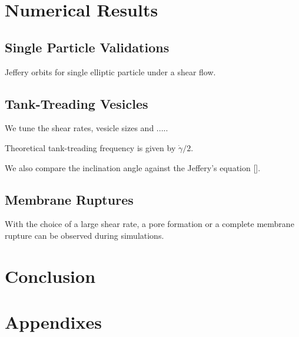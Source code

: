 \documentclass[%
 reprint,
 amsmath,amssymb,
 aps,
]{revtex4-2}
\begin{document}
\section{\label{results}Numerical Results}

\subsection{Single Particle Validations}

Jeffery orbits for single elliptic particle under a shear flow.




\subsection{Tank-Treading Vesicles}


We tune the shear rates, vesicle sizes and .....


Theoretical tank-treading frequency is given by $\dot\gamma/2$.


We also compare the inclination angle against the Jeffery's equation [].

\subsection{Membrane Ruptures}

With the choice of a large shear rate, a pore formation or a complete membrane rupture can be observed during simulations. 



\section{\label{conclusion}Conclusion}


\begin{acknowledgments}
\end{acknowledgments}

\appendix

\section{Appendixes}
\end{document}
